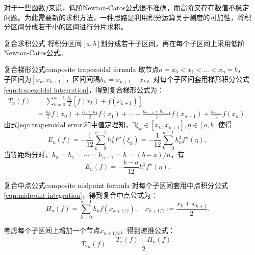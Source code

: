 对于一些函数$f$来说，低阶Newton-Catos公式很不准确，而高阶又存在数值不稳定问题。为此需要新的求积方法，一种思路是利用积分运算关于测度的可加性，将积分区间分成若干小的区间进行分片求积。

\begin{definition}
    {复合求积公式}{}
    将积分区间$[a,b]$划分成若干子区间，再在每个子区间上采用低阶Newton-Catos公式。
\end{definition}

\begin{example}
    {复合梯形公式}{composite trapezoidal formula}
    取节点$a=x_0<x_1<\ldots<x_n=b$，子区间为$[x_k,x_{k+1}]$，区间间隔$h_k=x_{k+1}-x_k$，对每个子区间套用梯形积分公式\eqref{eqn:trapezoidal integration}，得到复合梯形公式为：
    \begin{equation}
        \label{eqn:composite trapezoidal integration}
        \begin{aligned}
            T_n(f)&=\sum_{k=0}^{n-1}\frac{h_k}2[f(x_k)+f(x_{k+1})]\\
            &=\frac{h_0}2f(x_0)+\frac{h_0+h_1}2f(x_1)+\cdots+\frac{h_{n-2}+h_{n-1}}2f(x_{n-1})+\frac{h_{n-1}}2f(x_n).
        \end{aligned}
    \end{equation}
    由式\eqref{eqn:trapezoidal error}和中值定理知，$\exists\xi_k\in[x_k,x_{k+1}],\eta\in[a,b]$使得
    \begin{equation}
        E_n(f)=-\frac1{12}\sum_{k=0}^{n-1}h_k^3f''(\xi_k)=-\frac1{12}\sum_{k=0}^{n-1}h_k^3f''(\eta),
    \end{equation}
    当等距均分时，$h_0=h_1=\cdots=h_{n-1}=h=(b-a)/n$，有
    \begin{equation}
        E_n(f)=-\frac{b-a}{12}h^2f''(\eta).
    \end{equation}
\end{example}

\begin{example}
    {复合中点公式}{composite midpoint formula}
    对每个子区间套用中点积分公式\eqref{eqn:midpoint integration}，得到复合中点公式为：
    \begin{equation}
        H_n(f)=\sum_{k=0}^{n-1}h_kf(x_{k+1/2}),\quad x_{k+1/2}:=\frac{x_k+x_{k+1}}2.
    \end{equation}
\end{example}

\begin{corollary}
    考虑每个子区间上增加一个节点$x_{k+1/2}$，得到递推公式：
    \begin{equation}
        T_{2n}(f)=\frac{T_n(f)+H_n(f)}2.
    \end{equation}
\end{corollary}

